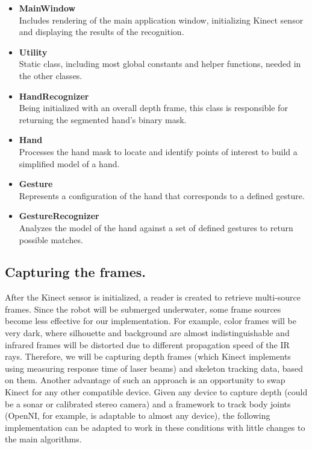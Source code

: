 \documentclass[a4paper,11pt,oneside]{article}
\begin{document}
\begin{itemize}
\item \textbf{MainWindow}\\
Includes rendering of the main application window, initializing Kinect sensor and displaying the results of the recognition.

\item \textbf{Utility}\\
Static class, including most global constants and helper functions, needed in the other classes.

\item \textbf{HandRecognizer}\\
Being initialized with an overall depth frame, this class is responsible for returning the segmented hand's binary mask.

\item \textbf{Hand}\\
Processes the hand mask to locate and identify points of interest to build a simplified model of a hand.

\item \textbf{Gesture}\\
Represents a configuration of the hand that corresponds to a defined gesture.

\item \textbf{GestureRecognizer}\\
Analyzes the model of the hand against a set of defined gestures to return possible matches.

\end{itemize}

\subsection{Capturing the frames.}

After the Kinect sensor is initialized, a reader is created to retrieve multi-source frames.  Since the robot will be submerged underwater, some frame sources become less effective for our implementation. For example, color frames will be very dark, where silhouette and background are almost indistinguishable and infrared frames will be distorted due to different propagation speed of the IR rays. Therefore, we will be capturing depth frames (which Kinect implements using measuring response time of laser beams) and skeleton tracking data, based on them. Another advantage of such an approach is an opportunity to swap Kinect for any other compatible device. Given any device to capture depth (could be a sonar or calibrated stereo camera) and a framework to track body joints (OpenNI, for example, is adaptable to almost any device), the following implementation can be adapted to work in these conditions with little changes to the main algorithms.\\
\end{document}
